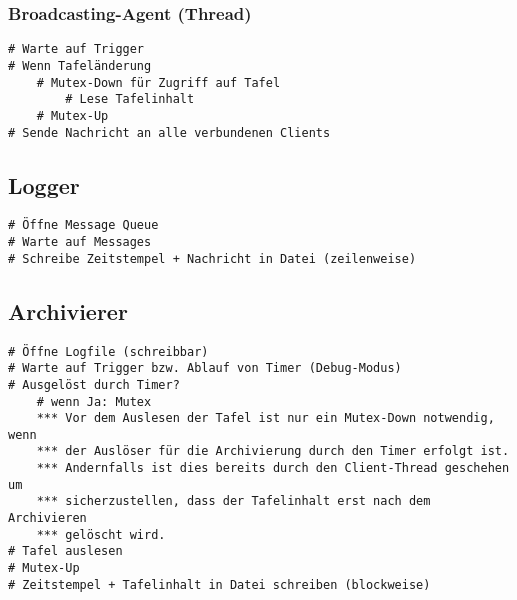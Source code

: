 \subsubsection{Broadcasting-Agent (Thread)}
\begin{lstlisting}
# Warte auf Trigger
# Wenn Tafeländerung
    # Mutex-Down für Zugriff auf Tafel
        # Lese Tafelinhalt
    # Mutex-Up
# Sende Nachricht an alle verbundenen Clients
\end{lstlisting}

\subsection{Logger}
\begin{lstlisting}
# Öffne Message Queue
# Warte auf Messages
# Schreibe Zeitstempel + Nachricht in Datei (zeilenweise)
\end{lstlisting}

\subsection{Archivierer}
\begin{lstlisting}
# Öffne Logfile (schreibbar)
# Warte auf Trigger bzw. Ablauf von Timer (Debug-Modus)
# Ausgelöst durch Timer?
    # wenn Ja: Mutex
    *** Vor dem Auslesen der Tafel ist nur ein Mutex-Down notwendig, wenn
    *** der Auslöser für die Archivierung durch den Timer erfolgt ist.
    *** Andernfalls ist dies bereits durch den Client-Thread geschehen um
    *** sicherzustellen, dass der Tafelinhalt erst nach dem Archivieren
    *** gelöscht wird.
# Tafel auslesen
# Mutex-Up
# Zeitstempel + Tafelinhalt in Datei schreiben (blockweise)
\end{lstlisting}
